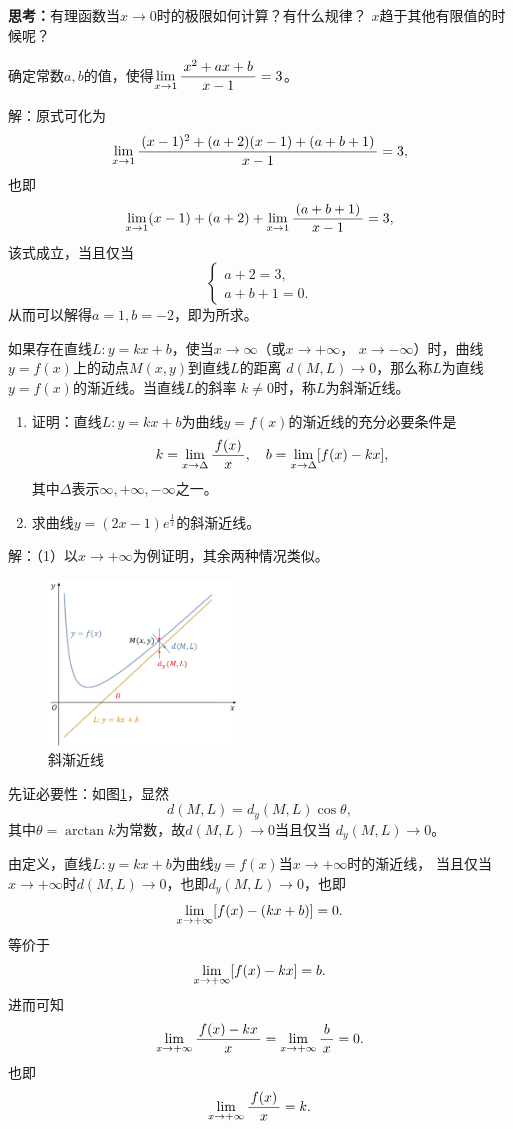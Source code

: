 {\bf 思考：}有理函数当$x\to 0$时的极限如何计算？有什么规律？
$x$趋于其他有限值的时候呢？

\bs
\egz 确定常数$a,b$的值，使得$\lim\limits_{x\to{1}}\displaystyle\frac{\,{x^2+ax+b}\,}{\,{x-1}\,}=3$。

解：原式可化为
$$\lim\limits_{x\to{1}}\displaystyle\frac{\,{(x-1)^2+(a+2)(x-1)+(a+b+1)}\,}{\,{x-1}\,}=3,$$
也即
$$\lim\limits_{x\to{1}}(x-1)+(a+2)+\lim\limits_{x\to{1}}\displaystyle\frac{\,{(a+b+1)}\,}{\,{x-1}\,}=3,$$
该式成立，当且仅当
$$
	\left\{\begin{array}{l}
		a+2=3,\\
		a+b+1=0.
	\end{array}\right.
$$
从而可以解得$a=1,b=-2$，即为所求。\fin

\bs
\egz 如果存在直线$L:y=kx+b$，使当$x\to\infty$（或$x\to+\infty$，
$x\to-\infty$）时，曲线$y=f(x)$上的动点$M(x,y)$到直线$L$的距离
$d(M,L)\to 0$，那么称$L$为直线$y=f(x)$的渐近线。当直线$L$的斜率
$k\ne 0$时，称$L$为斜渐近线。
\begin{enumerate}[(1)]
  \setlength{\itemindent}{1cm}
  \item 证明：直线$L:y=kx+b$为曲线$y=f(x)$的渐近线的充分必要条件是
  $$k=\lim\limits_{x\to{\Delta}}\displaystyle\frac{\,{f(x)}\,}{\,{x}\,},\quad
  b=\lim\limits_{x\to{\Delta}}[f(x)-kx],$$
  其中$\Delta$表示$\infty,+\infty,-\infty$之一。
  \item 求曲线$y=(2x-1)e^{\frac1x}$的斜渐近线。
\end{enumerate}

解：（1）以$x\to+\infty$为例证明，其余两种情况类似。

\begin{figure}[h]
	\centering
	\includegraphics[width=0.45\textwidth]{./images/ch01/fkxb.pdf}
	\caption{斜渐近线}
	\label{fig:fkxb}
\end{figure}

先证必要性：如图\ref{fig:fkxb}，显然
$$d(M,L)=d_y(M,L)\cos\theta,$$
其中$\theta=\arctan k$为常数，故$d(M,L)\to 0$当且仅当
$d_y(M,L)\to 0$。

由定义，直线$L:y=kx+b$为曲线$y=f(x)$当$x\to+\infty$时的渐近线，
当且仅当$x\to+\infty$时$d(M,L)\to 0$，也即$d_y(M,L)\to 0$，也即
$$\lim\limits_{x\to{+\infty}}[f(x)-(kx+b)]=0.$$
等价于
$$\lim\limits_{x\to{+\infty}}[f(x)-kx]=b.$$
进而可知
$$\lim\limits_{x\to{+\infty}}\displaystyle\frac{\,{f(x)-kx}\,}{\,{x}\,}=\lim\limits_{x\to{+\infty}}\displaystyle\frac{\,{b}\,}{\,{x}\,}=0.$$
也即
$$\lim\limits_{x\to{+\infty}}\displaystyle\frac{\,{f(x)}\,}{\,{x}\,}=k.$$

